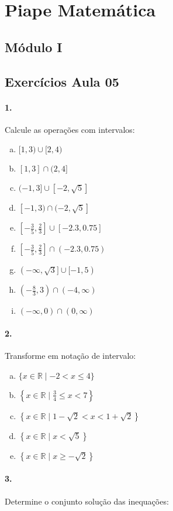 \documentclass[a4paper,twocolumn,12pt]{article}
\begin{document}
 
\section*{Piape Matemática} 
 
\subsection*{Módulo I}
\subsection*{Exercícios Aula 05}

\paragraph{1. }Calcule as operações com intervalos:
\begin{enumerate}[a)]
\item $[1, 3) \cup [2, 4)$
\item $[1, 3] \cap (2, 4]$
\item $(-1, 3] \cup  [-2, \sqrt{5}]$ 
\item $[-1, 3) \cap  (-2, \sqrt{5}]$ 
\item $\left[-\frac{3}{5},\frac{2}{3}\right] \cup [-2.3,0.75]$
\item $\left[-\frac{3}{5},\frac{2}{3}\right] \cap (-2.3,0.75)$
\item $(-\infty, \sqrt{3}] \cup [-1, 5)$
\item $\left(-\frac{8}{3},3\right)\cap (-4,\infty)$
\item $(-\infty, 0) \cap (0, \infty)$
\end{enumerate}


\paragraph*{2. } Transforme em notação de intervalo:
\begin{enumerate}[a)]
\item $\{x \in \mathbb{R} \mid -2 < x \leq 4\}$
\item $\left\{x \in \mathbb{R} \mid \frac{3}{4} \leq x < 7\right\}$
\item $\left\{x \in \mathbb{R} \mid 1-\sqrt{2} < x < 1+\sqrt{2}\right\}$
\item $\left\{x \in \mathbb{R} \mid x < \sqrt{5}\right\}$
\item $\left\{x \in \mathbb{R} \mid x \geq -\sqrt{2}\right\}$
\end{enumerate}

\paragraph*{3. } Determine o conjunto solução das inequações:
\end{document}
